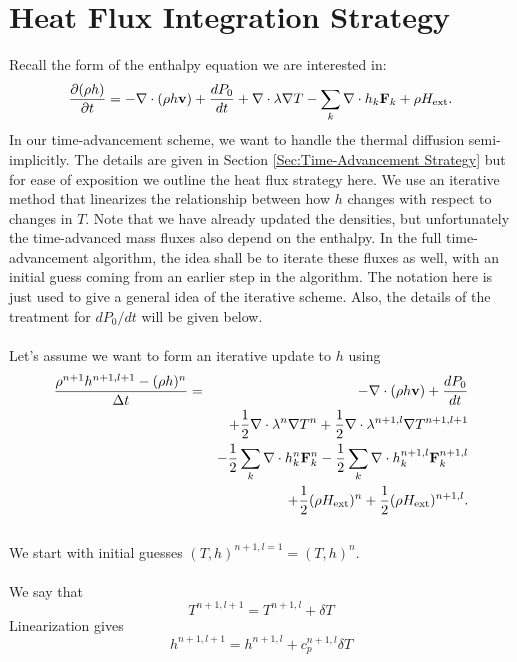 \documentclass[final]{siamltex}
\def\Fb {{\bf F}}
\def\vb {{\bf v}}
\def\Hext {H_{\rm ext}}
\def\half   {\frac{1}{2}}
\begin{document}
\section{Heat Flux Integration Strategy}
Recall the form of the enthalpy equation we are interested in:
\begin{equation}
\frac{\partial(\rho h)}{\partial t} = -\nabla\cdot(\rho h\vb) + \frac{dP_0}{dt} + \nabla\cdot\lambda\nabla T - \sum_k\nabla\cdot h_k\Fb_k + \rho\Hext.
\end{equation}
In our time-advancement scheme, we want to handle the thermal diffusion semi-implicitly.
The details are given in Section {\ref{Sec:Time-Advancement Strategy}} but for ease
of exposition we outline the heat flux strategy here.
We use an iterative method that
linearizes the relationship between how $h$ changes with respect to changes in $T$.
Note that we have already updated the densities, but unfortunately the time-advanced
mass fluxes also depend on the enthalpy.  In the full time-advancement algorithm,
the idea shall be to iterate these fluxes as well, with an initial guess coming from
an earlier step in the algorithm.  The notation here is just used to give a general
idea of the iterative scheme.  Also, the details of the treatment for 
$dP_0/dt$ will be given below.\\ \\
Let's assume we want to form an iterative update to $h$ using
\begin{eqnarray}
\frac{\rho^{n+1}h^{n+1,l+1} - (\rho h)^n}{\Delta t} &=& -\nabla\cdot(\rho h\vb) + \frac{dP_0}{dt}\nonumber\\
&&+ \half\nabla\cdot\lambda^n\nabla T^n + \half\nabla\cdot\lambda^{n+1,l}\nabla T^{n+1,l+1}\nonumber\\
&& - \half\sum_k\nabla\cdot h_k^n \Fb_k^n - \half\sum_k\nabla\cdot h_k^{n+1,l}\Fb_k^{n+1,l}\nonumber\\
&& + \half(\rho\Hext)^n + \half(\rho\Hext)^{n+1,l}.\label{eq:temp form}
\end{eqnarray}
\\
We start with initial guesses $(T,h)^{n+1,l=1} = (T,h)^n$.\\ \\
We say that
\begin{equation}
T^{n+1,l+1} = T^{n+1,l} + \delta T\label{eq:delta T}
\end{equation}
Linearization gives
\begin{equation}
h^{n+1,l+1} = h^{n+1,l} + c_p^{n+1,l}\delta T\label{eq:delta h}
\end{equation}
\end{document}
